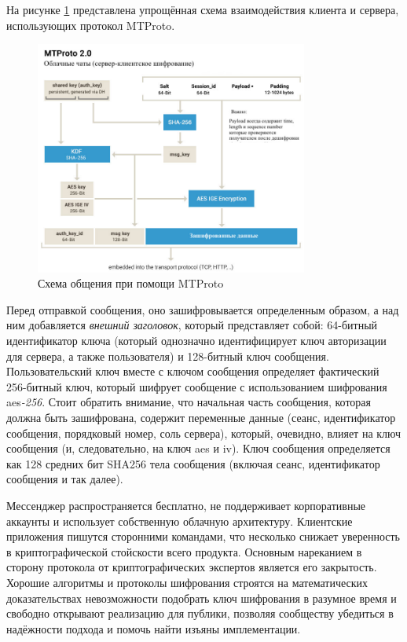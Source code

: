 На рисунке \ref{sec:analysis:research:analogs:telegram:mtproto1} представлена упрощённая схема взаимодействия клиента и сервера, использующих протокол MTProto.

\begin{figure}[h]
  \centering
    \includegraphics[width=0.8\textwidth]{inc/img/mtproto1.jpeg}
  \caption{Схема общения при помощи MTProto}
  \label{sec:analysis:research:analogs:telegram:mtproto1}
\end{figure}

Перед отправкой сообщения, оно зашифровывается определенным образом, а над ним добавляется \textit{внешний заголовок}, который представляет собой: 64-битный идентификатор ключа (который однозначно идентифицирует ключ авторизации для сервера, а также пользователя) и 128-битный ключ сообщения. Пользовательский ключ вместе с ключом сообщения определяет фактический 256-битный ключ, который шифрует сообщение с использованием шифрования \gls{aes}\textit{-256}. Стоит обратить внимание, что начальная часть сообщения, которая должна быть зашифрована, содержит переменные данные (сеанс, идентификатор сообщения, порядковый номер, соль сервера), который, очевидно, влияет на ключ сообщения (и, следовательно, на ключ \gls{aes} и iv). Ключ сообщения определяется как 128 средних бит SHA256 тела сообщения (включая сеанс, идентификатор сообщения и так далее).

Мессенджер распространяется бесплатно, не поддерживает корпоративные аккаунты и использует собственную облачную архитектуру. Клиентские приложения пишутся сторонними командами, что несколько снижает уверенность в криптографической стойскости всего продукта. Основным нареканием в сторону протокола от криптографических экспертов является его закрытость. Хорошие алгоритмы и протоколы шифрования строятся на математических доказательствах невозможности подобрать ключ шифрования в разумное время и свободно открывают реализацию для публики, позволяя сообществу убедиться в надёжности подхода и помочь найти изъяны имплементации.